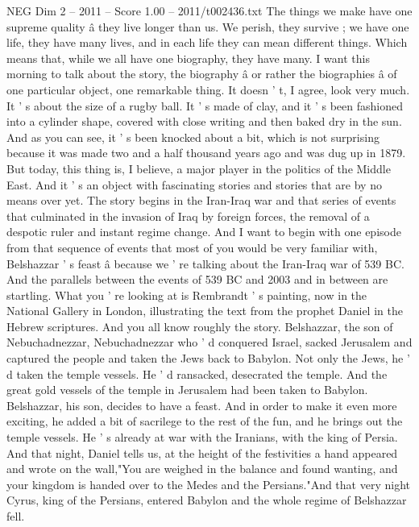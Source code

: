 \begin{textsample}{NEG Dim 2 – 2011 – Score 1.00 – 2011/t002436.txt}  \label{ex:f2_neg_016}
The things we make have one supreme quality â they live longer than us.
We perish, they survive ; we have one life, they have many lives, and in each life they can mean different things.
Which means that, while we all have one biography, they have many.
I want this morning to talk about the story, the biography â or rather the biographies â of one particular object, one remarkable thing.
It doesn ' t, I agree, look very much.
It ' s about the size of a rugby ball.
It ' s made of clay, and it ' s been fashioned into a cylinder shape, covered with close writing and then baked dry in the sun.
And as you can see, it ' s been knocked about a bit, which is not surprising because it was made two and a half thousand years ago and was dug up in 1879.
But today, this thing is, I believe, a major player in the politics of the Middle East.
And it ' s an object with fascinating stories and stories that are by no means over yet.
The story begins in the Iran-Iraq war and that series of events that culminated in the invasion of Iraq by foreign forces, the removal of a despotic ruler and instant regime change.
And I want to begin with one episode from that sequence of events that most of you would be very familiar with, Belshazzar ' s feast â because we ' re talking about the Iran-Iraq war of 539 BC.
And the parallels between the events of 539 BC and 2003 and in between are startling.
What you ' re looking at is Rembrandt ' s painting, now in the National Gallery in London, illustrating the text from the prophet Daniel in the Hebrew scriptures.
And you all know roughly the story.
Belshazzar, the son of Nebuchadnezzar, Nebuchadnezzar who ' d conquered Israel, sacked Jerusalem and captured the people and taken the Jews back to Babylon.
Not only the Jews, he ' d taken the temple vessels.
He ' d ransacked, desecrated the temple.
And the great gold vessels of the temple in Jerusalem had been taken to Babylon.
Belshazzar, his son, decides to have a feast.
And in order to make it even more exciting, he added a bit of sacrilege to the rest of the fun, and he brings out the temple vessels.
He ' s already at war with the Iranians, with the king of Persia.
And that night, Daniel tells us, at the height of the festivities a hand appeared and wrote on the wall,"You are weighed in the balance and found wanting, and your kingdom is handed over to the Medes and the Persians."And that very night Cyrus, king of the Persians, entered Babylon and the whole regime of Belshazzar fell.

\end{textsample}
